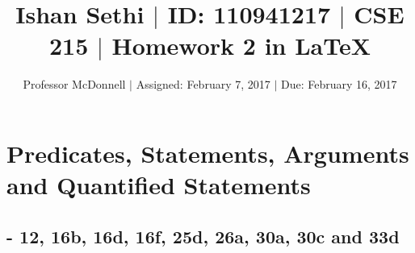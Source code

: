 \documentclass[11pt]{article}
\begin{document}
\title{\vspace{-.5in} Ishan Sethi $|$ ID: 110941217 $|$ CSE 215 $|$ Homework 2 in \LaTeX}
\author{Professor McDonnell $|$ Assigned: February 7, 2017 $|$ Due: February 16, 2017}
\date{}
\maketitle
\hrulefill
\tableofcontents

\section{Predicates, Statements, Arguments and Quantified Statements}
\subsection{ - 12, 16b, 16d, 16f, 25d, 26a, 30a, 30c and 33d}
\end{document}
